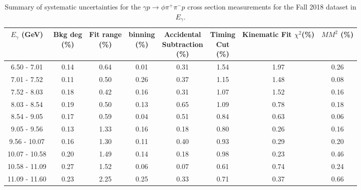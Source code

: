 \begin{center}
\null
\vfill
\begin{table}[!htbp]
    \small
    \centering
    \caption{Summary of systematic uncertainties for the $\gamma p \rightarrow \phi \pi^{+} \pi^{-} p$ cross section measurements for the Fall 2018 dataset in $E_{\gamma}$.}
    \label{tab.y2175.syserr.phi2pi.4.1}
    \begin{tabular}{|c|c|c|c|c|c|c|c|}
        \hline
        $E_{\gamma}$ (GeV)&\thead{Bkg deg\\(\%)}&\thead{Fit range\\(\%)}&\thead{binning\\(\%)}&\thead{Accidental\\Subtraction\\(\%)}&\thead{Timing\\Cut\\(\%)}&\thead{Kinematic\\Fit $\chi^{2}$(\%)}&\thead{$MM^{2}$\\(\%)}\\
        \hline
        6.50 - 7.01 & 0.14 & 0.64 & 0.01 & 0.31 & 1.54 & 1.97 & 0.26 \\ 
        7.01 - 7.52 & 0.11 & 0.50 & 0.26 & 0.37 & 1.15 & 1.48 & 0.08 \\ 
        7.52 - 8.03 & 0.18 & 0.42 & 0.16 & 0.31 & 1.07 & 1.52 & 0.16 \\ 
        8.03 - 8.54 & 0.19 & 0.50 & 0.13 & 0.65 & 1.09 & 0.78 & 0.18 \\ 
        8.54 - 9.05 & 0.17 & 0.59 & 0.04 & 0.51 & 0.84 & 0.63 & 0.06 \\ 
        9.05 - 9.56 & 0.13 & 1.33 & 0.16 & 0.18 & 0.80 & 0.26 & 0.16 \\ 
        9.56 - 10.07 & 0.16 & 1.30 & 0.11 & 0.40 & 0.93 & 0.29 & 0.20 \\ 
        10.07 - 10.58 & 0.20 & 1.49 & 0.14 & 0.18 & 0.98 & 0.23 & 0.46 \\ 
        10.58 - 11.09 & 0.27 & 1.52 & 0.06 & 0.07 & 0.61 & 0.74 & 0.24 \\ 
        11.09 - 11.60 & 0.23 & 2.25 & 0.25 & 0.33 & 0.71 & 0.37 & 0.66 \\
        \hline
    \end{tabular}
\end{table}
\end{center}

